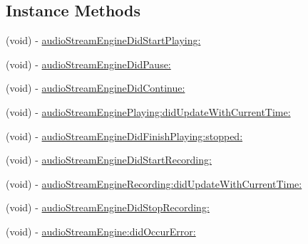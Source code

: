 \subsection*{Instance Methods}
\begin{DoxyCompactItemize}
\item 
(void) -\/ \hyperlink{protocol_s_e_audio_stream_engine_delegate-p_ad028df707bf49e8666b815bde8f40902}{audio\-Stream\-Engine\-Did\-Start\-Playing\-:}
\item 
(void) -\/ \hyperlink{protocol_s_e_audio_stream_engine_delegate-p_a1bd5a2cc2a8c641534cbb74a55773fcb}{audio\-Stream\-Engine\-Did\-Pause\-:}
\item 
(void) -\/ \hyperlink{protocol_s_e_audio_stream_engine_delegate-p_a25a68e34ad837b70cedc6d8485185fe3}{audio\-Stream\-Engine\-Did\-Continue\-:}
\item 
(void) -\/ \hyperlink{protocol_s_e_audio_stream_engine_delegate-p_af917adce2406d3802da99282c8fc1723}{audio\-Stream\-Engine\-Playing\-:did\-Update\-With\-Current\-Time\-:}
\item 
(void) -\/ \hyperlink{protocol_s_e_audio_stream_engine_delegate-p_a824aeca3299956565bfaa84ba4d04f33}{audio\-Stream\-Engine\-Did\-Finish\-Playing\-:stopped\-:}
\item 
(void) -\/ \hyperlink{protocol_s_e_audio_stream_engine_delegate-p_a192f31070f458201190d97c2e3dbbbee}{audio\-Stream\-Engine\-Did\-Start\-Recording\-:}
\item 
(void) -\/ \hyperlink{protocol_s_e_audio_stream_engine_delegate-p_a75f167807ad628680176d4438aeb840a}{audio\-Stream\-Engine\-Recording\-:did\-Update\-With\-Current\-Time\-:}
\item 
(void) -\/ \hyperlink{protocol_s_e_audio_stream_engine_delegate-p_ad693afa65ce5cc6560f40b8cf9719606}{audio\-Stream\-Engine\-Did\-Stop\-Recording\-:}
\item 
(void) -\/ \hyperlink{protocol_s_e_audio_stream_engine_delegate-p_afbb8aa7876ff176dc2e3bf52343084ce}{audio\-Stream\-Engine\-:did\-Occur\-Error\-:}
\end{DoxyCompactItemize}


